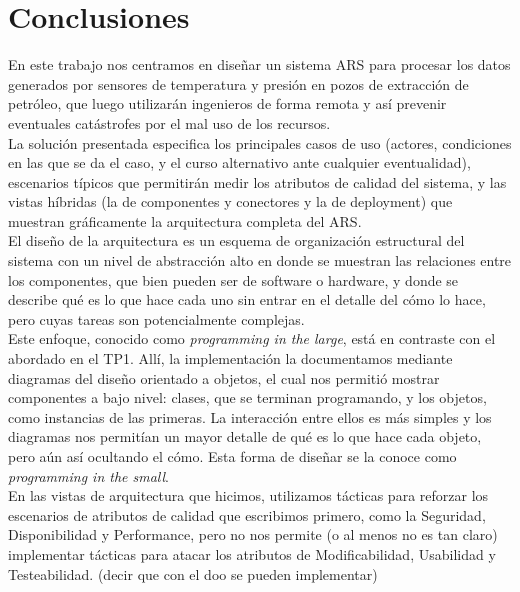 \section{Conclusiones}

En este trabajo nos centramos en diseñar un sistema ARS para procesar los datos generados por sensores de temperatura y presión en pozos de extracción de petróleo, que luego utilizarán ingenieros de forma remota y así prevenir eventuales catástrofes por el mal uso de los recursos. \\

La solución presentada especifica los principales casos de uso (actores, condiciones en las que se da el caso, y el curso alternativo ante cualquier eventualidad), escenarios típicos que permitirán medir los atributos de calidad del sistema, y las vistas híbridas (la de componentes y conectores y la de deployment) que muestran gráficamente la arquitectura completa del ARS. \\

El diseño de la arquitectura es un esquema de organización estructural del sistema con un nivel de abstracción alto en donde se muestran las relaciones entre los componentes, que bien pueden ser de software o hardware, y donde se describe qué es lo que hace cada uno sin entrar en el detalle del cómo lo hace, pero cuyas tareas son potencialmente complejas. \\

Este enfoque, conocido como \textit{programming in the large}, está en contraste con el abordado en el TP1. Allí, la implementación la documentamos mediante diagramas del diseño orientado a objetos, el cual nos permitió mostrar componentes a bajo nivel: clases, que se terminan programando, y los objetos, como instancias de las primeras. La interacción entre ellos es más simples y los diagramas nos permitían un mayor detalle de qué es lo que hace cada objeto, pero aún así ocultando el cómo. Esta forma de diseñar se la conoce como \textit{programming in the small}. \\

En las vistas de arquitectura que hicimos, utilizamos tácticas para reforzar los escenarios de atributos de calidad que escribimos primero, como la Seguridad, Disponibilidad y Performance, pero no nos permite (o al menos no es tan claro) implementar tácticas para atacar los atributos de Modificabilidad, Usabilidad y Testeabilidad. (decir que con el doo se pueden implementar)



